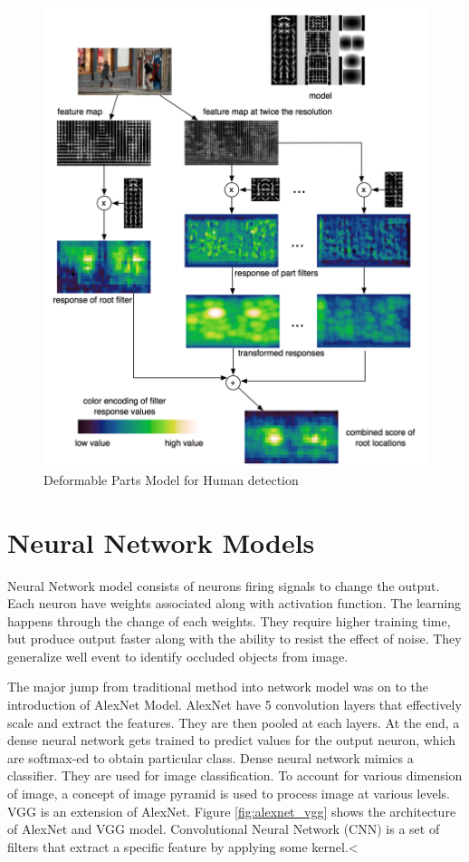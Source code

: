 \begin{figure}[!ht]
	\centering
	\includegraphics[width=0.7\linewidth]{Images/DPM}
	\caption{Deformable Parts Model for Human detection}
	\label{fig:dpm}

\end{figure}

\section{Neural Network Models}
Neural Network model consists of neurons firing signals to change the output. Each neuron have weights associated along with activation function. The learning happens through the change of each weights. They require higher training time, but produce output faster along with the ability to resist the effect of noise. They generalize well event to identify occluded objects from image. 

The major jump from traditional method into network model was on to the introduction of AlexNet Model. AlexNet have 5 convolution layers that effectively scale and extract the features. They are then pooled at each layers. At the end, a dense neural network gets trained to predict values for the output neuron, which are softmax-ed to obtain particular class. Dense neural network mimics a classifier. They are used for image classification. To account for various dimension of image, a concept of image pyramid is used to process image at various levels. VGG is an extension of AlexNet. Figure \ref{fig:alexnet_vgg} shows the architecture of AlexNet and VGG model. Convolutional Neural Network (CNN) is a set of filters that extract a specific feature by applying some kernel.<

